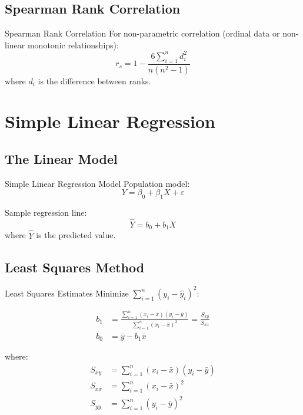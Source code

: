 \documentclass[12pt,a4paper]{book}
\begin{document}
\subsection{Spearman Rank Correlation}

\begin{definition}{Spearman Rank Correlation}
For non-parametric correlation (ordinal data or non-linear monotonic relationships):
\[
r_s = 1 - \frac{6\sum_{i=1}^{n} d_i^2}{n(n^2-1)}
\]
where $d_i$ is the difference between ranks.
\end{definition}

\section{Simple Linear Regression}

\subsection{The Linear Model}

\begin{definition}{Simple Linear Regression Model}
Population model:
\[
Y = \beta_0 + \beta_1 X + \varepsilon
\]

Sample regression line:
\[
\hat{Y} = b_0 + b_1 X
\]
where $\hat{Y}$ is the predicted value.
\end{definition}

\subsection{Least Squares Method}

\begin{definition}{Least Squares Estimates}
Minimize $\sum_{i=1}^{n} (y_i - \hat{y}_i)^2$:

\begin{align}
b_1 &= \frac{\sum_{i=1}^{n}(x_i - \bar{x})(y_i - \bar{y})}{\sum_{i=1}^{n}(x_i - \bar{x})^2} = \frac{S_{xy}}{S_{xx}}\\
b_0 &= \bar{y} - b_1\bar{x}
\end{align}

where:
\begin{align}
S_{xy} &= \sum_{i=1}^{n}(x_i - \bar{x})(y_i - \bar{y})\\
S_{xx} &= \sum_{i=1}^{n}(x_i - \bar{x})^2\\
S_{yy} &= \sum_{i=1}^{n}(y_i - \bar{y})^2
\end{align}
\end{definition}
\end{document}
